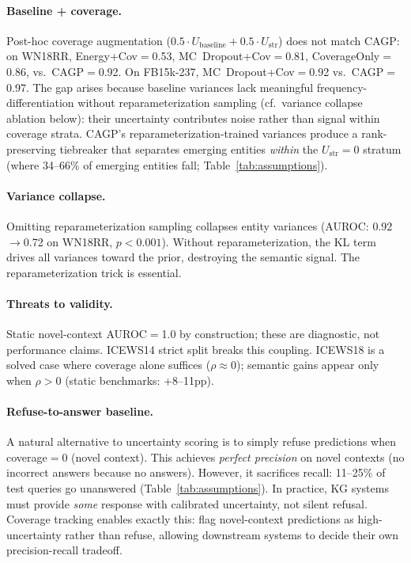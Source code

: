 \paragraph{Baseline + coverage.}
Post-hoc coverage augmentation ($0.5 \cdot U_{\text{baseline}} + 0.5 \cdot U_{\text{str}}$) does not match CAGP: on WN18RR, Energy+Cov$=$0.53, MC~Dropout+Cov$=$0.81, CoverageOnly$=$0.86, vs.\ CAGP$=$0.92. On FB15k-237, MC~Dropout+Cov$=$0.92 vs.\ CAGP$=$0.97. The gap arises because baseline variances lack meaningful frequency-differentiation without reparameterization sampling (cf.\ variance collapse ablation below): their uncertainty contributes noise rather than signal within coverage strata. CAGP's reparameterization-trained variances produce a rank-preserving tiebreaker that separates emerging entities \emph{within} the $U_{\text{str}}{=}0$ stratum (where 34--66\% of emerging entities fall; Table~\ref{tab:assumptions}).

\paragraph{Variance collapse.}
Omitting reparameterization sampling collapses entity variances (AUROC: 0.92$\to$0.72 on WN18RR, $p < 0.001$). Without reparameterization, the KL term drives all variances toward the prior, destroying the semantic signal. The reparameterization trick is essential.

\paragraph{Threats to validity.}
Static novel-context AUROC$=$1.0 by construction; these are diagnostic, not performance claims. ICEWS14 strict split breaks this coupling. ICEWS18 is a solved case where coverage alone suffices ($\rho \approx 0$); semantic gains appear only when $\rho > 0$ (static benchmarks: +8--11pp).

\paragraph{Refuse-to-answer baseline.}
A natural alternative to uncertainty scoring is to simply refuse predictions when coverage$=$0 (novel context). This achieves \emph{perfect precision} on novel contexts (no incorrect answers because no answers). However, it sacrifices recall: 11--25\% of test queries go unanswered (Table~\ref{tab:assumptions}). In practice, KG systems must provide \emph{some} response with calibrated uncertainty, not silent refusal. Coverage tracking enables exactly this: flag novel-context predictions as high-uncertainty rather than refuse, allowing downstream systems to decide their own precision-recall tradeoff.

